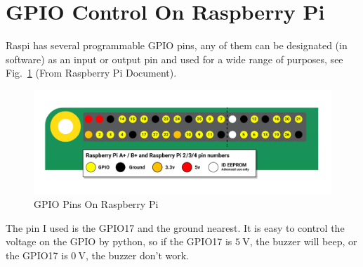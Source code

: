 \documentclass{article}
\begin{document}
\section{GPIO Control On Raspberry Pi}
Raspi has several programmable GPIO pins, any of them can be designated (in software) as an input or output pin and used for a wide range of purposes, see Fig.~\ref{fig:GPIO} (From Raspberry Pi Document\cite{GPIO}).

\begin{figure}[!h]
	\centering
	\includegraphics[width=3 in]{../pic/GPIO.png}
	\caption{GPIO Pins On Raspberry Pi}
	\label{fig:GPIO}
\end{figure}

The pin I used is the GPIO17 and the ground nearest. It is easy to control the voltage on the GPIO by python, so if the GPIO17 is $5 ~\mathrm{V}$, the buzzer will beep, or the GPIO17 is $0 ~\mathrm{V}$, the buzzer don't work.



\end{document}
